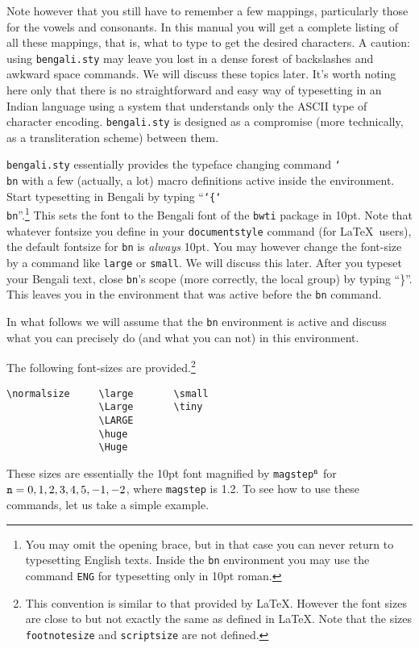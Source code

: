 Note however that you still have to remember a few mappings, particularly
those for the vowels and consonants. In this manual you will get a complete
listing of all these mappings, that is, what to type to get the desired
characters. A caution: using {\tt bengali.sty} may leave you
lost in a dense forest of backslashes and awkward space commands. We will discuss
these topics later. It's worth noting here only that there is no
straightforward and easy way of typesetting in an Indian language using
a system that understands only the ASCII type of character encoding.
{\tt bengali.sty} is designed as
a compromise (more technically, as a transliteration scheme) between them.

{\tt bengali.sty} essentially provides the typeface changing command
{\tt \char`\\bn} with a few (actually, a lot)
macro definitions active inside the environment. Start typesetting
in Bengali by typing ``{\tt \char`\{\char`\\bn}''.\footnote{You may
omit the opening brace, but in that case you can never return to
typesetting English texts.
Inside the {\tt \bs bn} environment you may use the command {\tt \bs ENG} for
typesetting only in 10pt roman.}
This sets the font to the Bengali font of the {\tt bwti} package in
10pt. Note that whatever fontsize you define in your {\tt \bs documentstyle}
command (for \LaTeX\ users), the default fontsize for {\tt \bs bn} is
{\em always} 10pt. You may however change the font-size by a command like
{\tt \bs large} or {\tt \bs small}. We will discuss this later.
After you typeset your Bengali text, close {\tt \bs bn}'s scope
(more correctly, the local group) by typing ``\}''. This leaves you in
the environment that was active before the {\tt \bs bn} command.

In what follows we will assume that the {\tt \bs bn} environment is active
and discuss what you can precisely do (and what you can not) in this
environment.

The following font-sizes are provided.\footnote{This convention is
similar to that provided by \LaTeX. However the font sizes are close to
but not exactly the same as defined in \LaTeX. Note that the sizes
{\tt \bs footnotesize} and {\tt \bs scriptsize} are not defined.}
\begin{verbatim}
\normalsize     \large       \small
                \Large       \tiny
                \LARGE
                \huge
                \Huge
\end{verbatim}
These sizes are essentially the 10pt font magnified by
{\tt \bs magstep}$^{\tt n}$ for ${\tt n} = 0,1,2,3,4,5,-1,-2$, where
{\tt \bs magstep} is 1.2. To see how to use these commands, let us take a
simple example.

